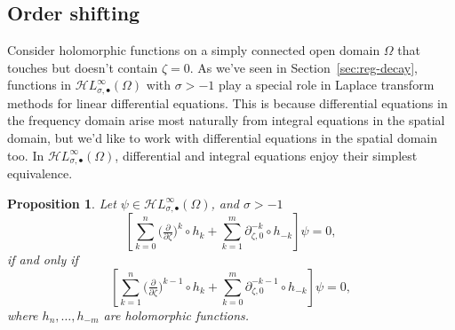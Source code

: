 \documentclass{article}
\newcommand{\singexp}[2]{\mathcal{H}L^\infty_{#1, #2}}
\newcommand{\singexpalg}[1]{\singexp{#1}{\bullet}}
\newcommand{\Z}{\mathbb{Z}}
\newcommand{\R}{\mathbb{R}}
\newcommand{\fracderiv}[3]{\partial^{#1}_{#2, #3}}
\theoremstyle{definition}
\theoremstyle{plain}
\newtheorem{prop}[definition]{Proposition}
\begin{document}
\subsection{Order shifting}\label{shifting}
Consider holomorphic functions on a simply connected open domain $\Omega$ that touches but doesn't contain $\zeta = 0$. %
As we've seen in Section~\ref{sec:reg-decay}, functions in $\singexpalg{\sigma}(\Omega)$ with $\sigma>-1$ play a special role in Laplace transform methods for linear differential equations. This is because differential equations in the frequency domain arise most naturally from integral equations in the spatial domain, but we'd like to work with differential equations in the spatial domain too. In $\singexpalg{\sigma}(\Omega)$, differential and integral equations enjoy their simplest equivalence.
\begin{prop}\label{prop:shifting}
Let $\psi\in\singexpalg{\sigma}(\Omega)$, and $\sigma>-1$
\[ \left[ \sum_{k = 0}^n \big(\tfrac{\partial}{\partial \zeta}\big)^k \circ h_k + \sum_{k = 1}^m \fracderiv{-k}{\zeta}{0} \circ h_{-k} \right] \psi = 0, \]
if and only if
\[ \left[ \sum_{k = 1}^n \big(\tfrac{\partial}{\partial \zeta}\big)^{k-1} \circ h_k + \sum_{k = 0}^m \fracderiv{-k-1}{\zeta}{0} \circ h_{-k} \right] \psi = 0, \]
where $h_n, \ldots, h_{-m}$ are holomorphic functions.
\end{prop}

\end{document}
